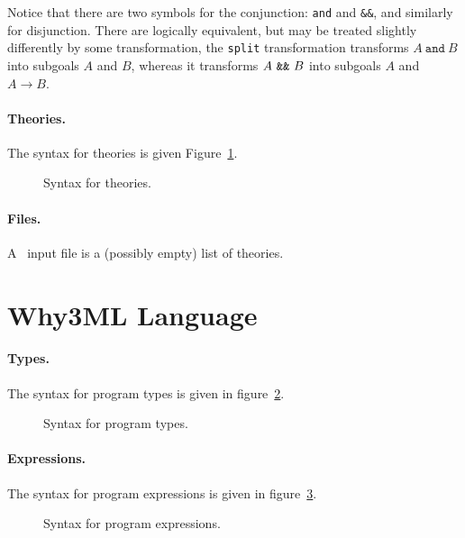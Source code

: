 Notice that there are two symbols for the conjunction: \texttt{and}
and \verb|&&|, and similarly for disjunction. There are logically
equivalent, but may be treated slightly differently by some
transformation, \eg{} the \texttt{split} transformation transforms
$A~\texttt{and}~B$ into subgoals $A$ and $B$, whereas it transforms
$A~\verb|&&|~B$ into subgoals $A$ and $A\rightarrow B$.

\paragraph{Theories.}
The syntax for theories is given Figure~\ref{fig:bnf:theory}.

\begin{figure}[p]
  \begin{center}\framebox{}\end{center}
  \caption{Syntax for theories.}
\label{fig:bnf:theory}
\end{figure}

\paragraph{Files.}
A \why\ input file is a (possibly empty) list of theories.
\begin{center}\framebox{}\end{center}


\section{Why3ML Language}\label{sec:syntax:whyml}

\paragraph{Types.}
The syntax for program types is given in figure~\ref{fig:bnf:typev}.
\begin{figure}[p]
  \begin{center}\framebox{}\end{center}
  \caption{Syntax for program types.}
\label{fig:bnf:typev}
\end{figure}

\paragraph{Expressions.}
The syntax for program expressions is given in figure~\ref{fig:bnf:expr}.
\begin{figure}[p]
  \begin{center}\framebox{}\end{center}
  \caption{Syntax for program expressions.}
\label{fig:bnf:expr}
\end{figure}

